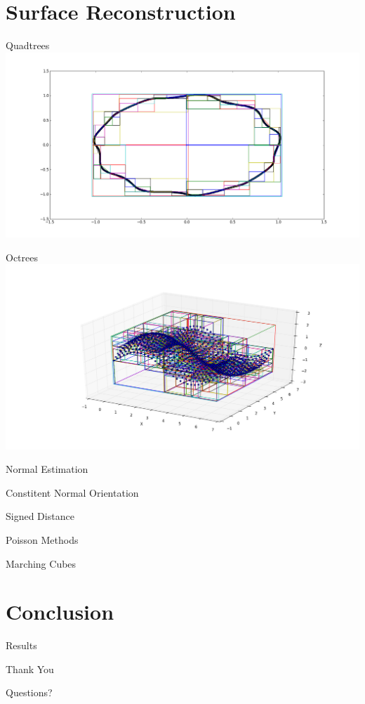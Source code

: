\documentclass{beamer}
\begin{document}
\section{Surface Reconstruction}
\begin{frame}{Quadtrees}
  \includegraphics[width=\textwidth]{quadtree.png}
\end{frame}
\begin{frame}{Octrees}
  \includegraphics[width=\textwidth]{octree.png}
\end{frame}

\begin{frame}{Normal Estimation}
\end{frame}

\begin{frame}{Constitent Normal Orientation}
\end{frame}

\begin{frame}{Signed Distance}
\end{frame}

\begin{frame}{Poisson Methods}
\end{frame}

\begin{frame}{Marching Cubes}
\end{frame}

\section{Conclusion}

\begin{frame}{Results}
\end{frame}

\begin{frame}{Thank You}
\end{frame}

\begin{frame}{Questions?}
\end{frame}
  
\end{document}
